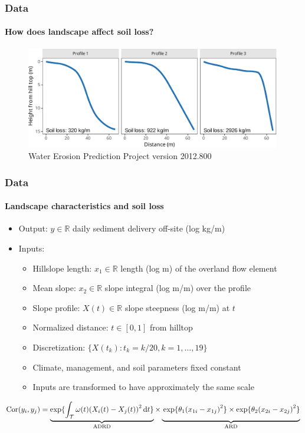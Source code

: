 \documentclass{snedecorbeamer}
\begin{document}
\begin{frame}
  \frametitle{Data}
  \framesubtitle{How does landscape affect soil loss?}

  \begin{figure}
    \centering
    \includegraphics[height=12em]{inc/wepp_elevation_profiles}
    \caption*{
          \href{https://www.ars.usda.gov/midwest-area/west-lafayette-in/national-soil-erosion-research/docs/wepp/}{}
      Water Erosion Prediction Project version 2012.800
    }
  \end{figure}

\end{frame}

\begin{frame}
  \frametitle{Data}
  \framesubtitle{Landscape characteristics and soil loss}

  \begin{itemize}
  \item Output: $y\in\mathbb{R}$ daily sediment delivery off-site (log kg/m)
  \item Inputs:
    \begin{itemize}
    \item Hillslope length: $x_1\in\mathbb{R}$ length (log m) of the overland flow
      element
    \item Mean slope: $x_2\in\mathbb{R}$ slope integral (log m/m) over the profile
    \item Slope profile: $X(t)\in\mathbb{R}$ slope steepness (log m/m) at $t$
    \item Normalized distance: $t\in[0, 1]$ from hilltop
    \item Discretization: $\{X(t_k) : t_k = k / 20, k = 1, \dots, 19\}$
    \item Climate, management, and soil parameters fixed constant
    \item Inputs are transformed to have approximately the same scale
    \end{itemize}
  \end{itemize}

  \vfill

  $\mathrm{Cor}(y_i, y_j) =
  \underbrace{\exp\{
    \int_\mathcal{T}
    \omega(t){(X_i(t) - X_j(t))}^2\,\mathrm{d}t\}
  }_{\mathrm{ADRD}}
  \times
  \underbrace{
    \vphantom{\int_\mathcal{T}}
      \exp\{\theta_1 {(x_{1i} - x_{1j})}^2\}
  \times
  \exp\{\theta_2 {(x_{2i} - x_{2j})}^2\}
  }_{\mathrm{ARD}}$
\end{frame}
\end{document}
